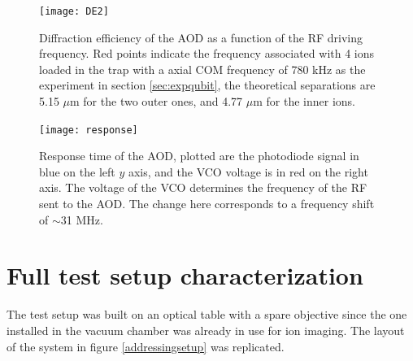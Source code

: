 \begin{figure}
\centering
\texttt{[image: DE2]}
\caption{Diffraction efficiency of the AOD as a function of the RF driving frequency. Red points indicate the frequency associated with 4 ions loaded in the trap with a axial COM frequency of 780 kHz as the experiment in section \ref{sec:expqubit}, the theoretical separations are 5.15 $\mu$m for the two outer ones, and 4.77 $\mu$m for the inner ions.}
\label{DE}
\end{figure}

\begin{figure}
\centering
\texttt{[image: response]}
\caption{Response time of the AOD, plotted are the photodiode signal in blue on the left $y$ axis, and the VCO voltage is in red on the right axis. The voltage of the VCO determines the frequency of the RF sent to the AOD. The change here corresponds to a frequency shift of $\sim$31 MHz.}
\label{response}
\end{figure}

\section{Full test setup characterization}
\label{sec:fullsetup}
The test setup was built on an optical table with a spare objective since the one installed in the vacuum chamber was already in use for ion imaging. The layout of the system in figure \ref{addressingsetup} was replicated.

